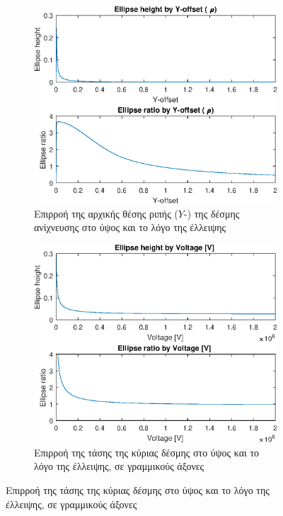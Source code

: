 \begin{figure}[tph]
\begin{subfigure}{0.47\textwidth}
		\label{fig:EBS-variables-length}
	\end{subfigure}
	\par\bigskip
	\begin{subfigure}{0.47\textwidth}
		\includegraphics[width=\linewidth]{figures/MATLAB-variable-analysis/EBS-variables-rho}
		\centering
		\caption[Επιρροή της αρχικής θέσης ριπής της δέσμης ανίχνευσης στην ύψος και το λόγο της έλλειψης]{Επιρροή της αρχικής θέσης ριπής ($Y$-) της δέσμης ανίχνευσης στο ύψος και το λόγο της έλλειψης}
		\label{fig:EBS-variables-rho}
	\end{subfigure}
	\hfill
	\begin{subfigure}{0.47\textwidth}
		\includegraphics[width=\linewidth]{figures/MATLAB-variable-analysis/EBS-variables-voltage-linear}
		\centering
		\caption{Επιρροή της τάσης της κύριας δέσμης στο ύψος και το λόγο της έλλειψης, σε γραμμικούς άξονες}
		\label{fig:EBS-variables-voltage-linear}
	\end{subfigure}
\label{fig:beam-deflectoin}
\end{figure}



